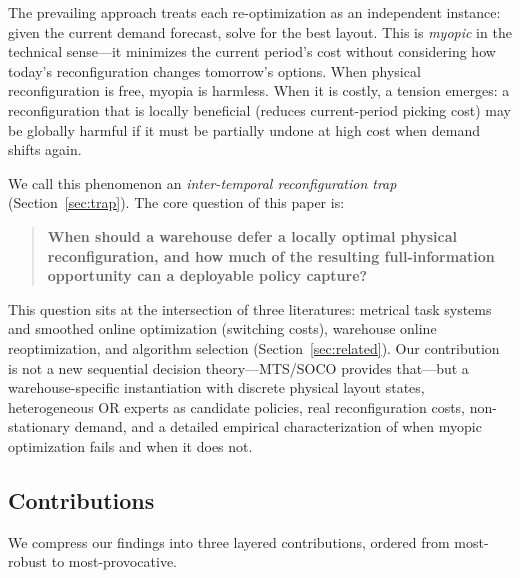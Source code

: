 \documentclass[11pt,a4paper]{article}
\begin{document}
The prevailing approach treats each re-optimization as an independent
instance: given the current demand forecast, solve for the best layout.
This is \emph{myopic} in the technical sense---it minimizes the current
period's cost without considering how today's reconfiguration changes
tomorrow's options. When physical reconfiguration is free, myopia is
harmless. When it is costly, a tension emerges: a reconfiguration that is
locally beneficial (reduces current-period picking cost) may be globally
harmful if it must be partially undone at high cost when demand shifts
again.

We call this phenomenon an \emph{inter-temporal reconfiguration trap}
(Section~\ref{sec:trap}). The core question of this paper is:

\begin{quote}
\textbf{When should a warehouse defer a locally optimal physical
reconfiguration, and how much of the resulting full-information
opportunity can a deployable policy capture?}
\end{quote}

This question sits at the intersection of three literatures: metrical task
systems and smoothed online optimization (switching costs),
warehouse online reoptimization, and algorithm selection
(Section~\ref{sec:related}). Our contribution is not a new sequential
decision theory---MTS/SOCO provides that---but a warehouse-specific
instantiation with discrete physical layout states, heterogeneous OR
experts as candidate policies, real reconfiguration costs, non-stationary
demand, and a detailed empirical characterization of when myopic
optimization fails and when it does not.

\subsection{Contributions}

We compress our findings into three layered contributions, ordered from
most-robust to most-provocative.
\end{document}
